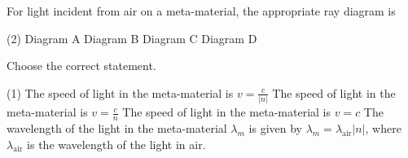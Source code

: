 \item For light incident from air on a meta-material, the appropriate ray diagram is
    \begin{tasks}(2)
        \task Diagram A
        \task Diagram B
        \task Diagram C
        \task Diagram D
    \end{tasks} 

\item Choose the correct statement.
    \begin{tasks}(1)
        \task The speed of light in the meta-material is \( v = \frac{c}{|n|} \)
        \task The speed of light in the meta-material is \( v = \frac{c}{n} \)
        \task The speed of light in the meta-material is \( v = c \)
        \task The wavelength of the light in the meta-material \( \lambda_m \) is given by \( \lambda_m = \lambda_{\text{air}}|n|\), where \( \lambda_{\text{air}} \) is the wavelength of the light in air.
    \end{tasks} 
